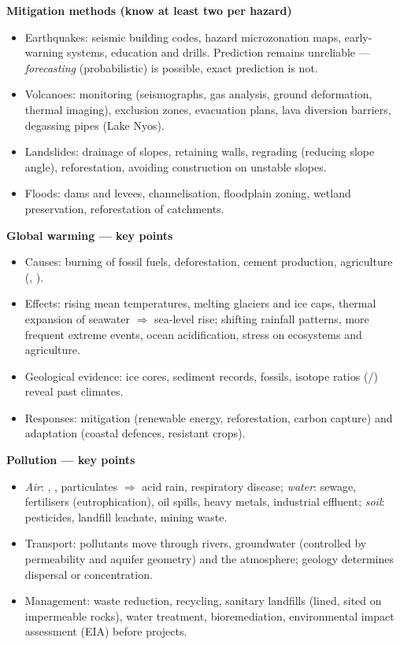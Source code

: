 \documentclass[11pt]{article}
\newcommand{\cle}[1]{{\popxbold\color{popdark}#1}}
\begin{document}
\begin{aretenir}
\textbf{Mitigation methods (know at least two per hazard)}
\begin{itemize}
\item Earthquakes: seismic building codes, hazard microzonation maps, early-warning systems, education and drills. Prediction remains unreliable — \emph{forecasting} (probabilistic) is possible, exact prediction is not.
\item Volcanoes: monitoring (seismographs, gas analysis, ground deformation, thermal imaging), exclusion zones, evacuation plans, lava diversion barriers, degassing pipes (Lake Nyos).
\item Landslides: drainage of slopes, retaining walls, regrading (reducing slope angle), reforestation, avoiding construction on unstable slopes.
\item Floods: dams and levees, channelisation, floodplain zoning, wetland preservation, reforestation of catchments.
\end{itemize}

\textbf{Global warming — key points}
\begin{itemize}
\item Causes: burning of fossil fuels, deforestation, cement production, agriculture (, ).
\item Effects: rising mean temperatures, melting glaciers and ice caps, thermal expansion of seawater $\Rightarrow$ \cle{sea-level rise}; shifting rainfall patterns, more frequent extreme events, ocean acidification, stress on ecosystems and agriculture.
\item Geological evidence: ice cores, sediment records, fossils, isotope ratios (/) reveal past climates.
\item Responses: mitigation (renewable energy, reforestation, carbon capture) and adaptation (coastal defences, resistant crops).
\end{itemize}

\textbf{Pollution — key points}
\begin{itemize}
\item \emph{Air}: , , particulates $\Rightarrow$ acid rain, respiratory disease; \emph{water}: sewage, fertilisers (eutrophication), oil spills, heavy metals, industrial effluent; \emph{soil}: pesticides, landfill leachate, mining waste.
\item Transport: pollutants move through rivers, groundwater (controlled by \cle{permeability} and aquifer geometry) and the atmosphere; geology determines dispersal or concentration.
\item Management: waste reduction, recycling, sanitary landfills (lined, sited on impermeable rocks), water treatment, bioremediation, environmental impact assessment (EIA) before projects.
\end{itemize}


\end{aretenir}
\end{document}
